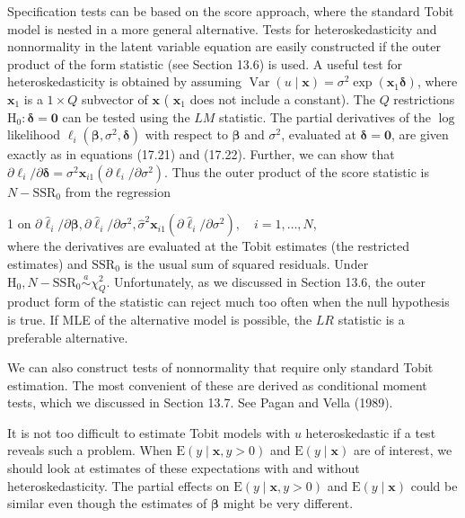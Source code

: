 \documentclass[10pt]{article}
\begin{document}
Specification tests can be based on the score approach, where the standard Tobit model is nested in a more general alternative. Tests for heteroskedasticity and nonnormality in the latent variable equation are easily constructed if the outer product of the form statistic (see Section 13.6) is used. A useful test for heteroskedasticity is obtained by assuming $\operatorname{Var}(u \mid \mathbf{x})=\sigma^{2} \exp \left(\mathbf{x}_{1} \boldsymbol{\delta}\right)$, where $\mathbf{x}_{1}$ is a $1 \times Q$ subvector of $\mathbf{x}$ ( $\mathbf{x}_{1}$ does not include a constant). The $Q$ restrictions $\mathrm{H}_{0}: \boldsymbol{\delta}=\mathbf{0}$ can be tested using the $L M$ statistic. The partial derivatives of the $\log$ likelihood $\ell_{i}\left(\boldsymbol{\beta}, \sigma^{2}, \boldsymbol{\delta}\right)$ with respect to $\boldsymbol{\beta}$ and $\sigma^{2}$, evaluated at $\boldsymbol{\delta}=\mathbf{0}$, are given exactly as in equations (17.21) and (17.22). Further, we can show that $\partial \ell_{i} / \partial \boldsymbol{\delta}=\sigma^{2} \mathbf{x}_{i 1}\left(\partial \ell_{i} / \partial \sigma^{2}\right)$. Thus the outer product of the score statistic is $N-\mathrm{SSR}_{0}$ from the regression

1 on $\partial \hat{\ell}_{i} / \partial \boldsymbol{\beta}, \partial \hat{\ell}_{i} / \partial \sigma^{2}, \hat{\sigma}^{2} \mathbf{x}_{i 1}\left(\partial \hat{\ell}_{i} / \partial \sigma^{2}\right), \quad i=1, \ldots, N$,\\
where the derivatives are evaluated at the Tobit estimates (the restricted estimates) and $\mathrm{SSR}_{0}$ is the usual sum of squared residuals. Under $\mathrm{H}_{0}, N-\mathrm{SSR}_{0} \stackrel{a}{\sim} \chi_{Q}^{2}$. Unfortunately, as we discussed in Section 13.6, the outer product form of the statistic can reject much too often when the null hypothesis is true. If MLE of the alternative model is possible, the $L R$ statistic is a preferable alternative.

We can also construct tests of nonnormality that require only standard Tobit estimation. The most convenient of these are derived as conditional moment tests, which we discussed in Section 13.7. See Pagan and Vella (1989).

It is not too difficult to estimate Tobit models with $u$ heteroskedastic if a test reveals such a problem. When $\mathrm{E}(y \mid \mathbf{x}, y>0)$ and $\mathrm{E}(y \mid \mathbf{x})$ are of interest, we should look at estimates of these expectations with and without heteroskedasticity. The partial effects on $\mathrm{E}(y \mid \mathbf{x}, y>0)$ and $\mathrm{E}(y \mid \mathbf{x})$ could be similar even though the estimates of $\boldsymbol{\beta}$ might be very different.
\end{document}
